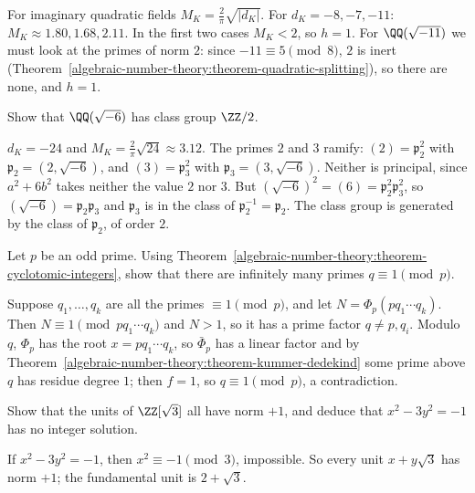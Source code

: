 \begin{solution}
For imaginary quadratic fields $M_K = \frac2\pi\sqrt{|d_K|}$. For $d_K = -8, -7, -11$: $M_K \approx 1.80, 1.68, 2.11$. In the first two cases $M_K < 2$, so $h = 1$. For $\QQ(\sqrt{-11})$ we must look at the primes
of norm $2$: since $-11 \equiv 5 \pmod 8$, $2$ is inert (Theorem~\ref{algebraic-number-theory:theorem-quadratic-splitting}), so there are none, and $h = 1$.
\end{solution}

\begin{exercise}\label{algebraic-number-theory:exercise-sqrt-minus-six}
Show that $\QQ(\sqrt{-6})$ has class group $\ZZ/2$.
\end{exercise}

\begin{solution}
$d_K = -24$ and $M_K = \frac2\pi\sqrt{24} \approx 3.12$. The primes $2$ and $3$ ramify: $(2) = \mathfrak{p}_2^2$ with $\mathfrak{p}_2 = (2, \sqrt{-6})$, and $(3) = \mathfrak{p}_3^2$ with $\mathfrak{p}_3 = (3, \sqrt{-6})$. Neither is
principal, since $a^2 + 6b^2$ takes neither the value $2$ nor $3$. But $(\sqrt{-6})^2 = (6) = \mathfrak{p}_2^2\mathfrak{p}_3^2$, so $(\sqrt{-6}) = \mathfrak{p}_2\mathfrak{p}_3$ and $\mathfrak{p}_3$ is in the class of
$\mathfrak{p}_2^{-1} = \mathfrak{p}_2$. The class group is generated by the class of $\mathfrak{p}_2$, of order $2$.
\end{solution}

\begin{exercise}\label{algebraic-number-theory:exercise-split-cyclotomic}
Let $p$ be an odd prime. Using Theorem~\ref{algebraic-number-theory:theorem-cyclotomic-integers}, show that there are infinitely many primes $q \equiv 1 \pmod p$.
\end{exercise}

\begin{solution}
Suppose $q_1, \dots, q_k$ are all the primes $\equiv 1 \pmod p$, and let
$N = \Phi_p(pq_1\cdots q_k)$. Then $N \equiv 1 \pmod{pq_1 \cdots q_k}$ and $N > 1$, so it has a prime factor $q \neq p, q_i$. Modulo $q$, $\Phi_p$ has the root $x = pq_1\cdots q_k$, so $\bar\Phi_p$ has a
linear factor and by Theorem~\ref{algebraic-number-theory:theorem-kummer-dedekind} some prime above $q$ has residue degree $1$; then $f = 1$, so $q \equiv 1 \pmod p$, a contradiction.
\end{solution}

\begin{exercise}\label{algebraic-number-theory:exercise-units-norm}
Show that the units of $\ZZ[\sqrt3]$ all have norm $+1$, and deduce that $x^2 - 3y^2 = -1$ has no integer solution.
\end{exercise}

\begin{solution}
If $x^2 - 3y^2 = -1$, then $x^2 \equiv -1 \pmod 3$, impossible. So every unit $x + y\sqrt3$ has norm $+1$; the fundamental unit is $2 + \sqrt3$.
\end{solution}
